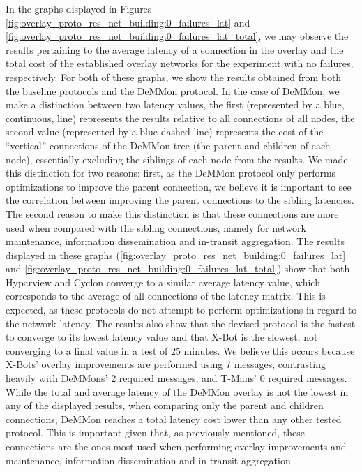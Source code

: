 In the graphs displayed in Figures \ref{fig:overlay_proto_res_net_building:0_failures_lat} and \ref{fig:overlay_proto_res_net_building:0_failures_lat_total}, we may observe the results pertaining to the average latency of a connection in the overlay and the total cost of the established overlay networks for the experiment with no failures, respectively. For both of these graphs, we show the results obtained from both the baseline protocols and the DeMMon protocol. In the case of DeMMon, we make a distinction between two latency values, the first (represented by a blue, continuous, line) represents the results relative to all connections of all nodes, the second value (represented by a blue dashed line) represents the cost of the ``vertical'' connections of the DeMMon tree (the parent and children of each node), essentially excluding the siblings of each node from the results. We made this distinction for two reasons: first, as the DeMMon protocol only performs optimizations to improve the parent connection, we believe it is important to see the correlation between improving the parent connections to the sibling latencies. The second reason to make this distinction is that these connections are more used when compared with the sibling connections, namely for network maintenance, information dissemination and in-transit aggregation. The results displayed in these graphs (\ref{fig:overlay_proto_res_net_building:0_failures_lat} and \ref{fig:overlay_proto_res_net_building:0_failures_lat_total}) show that both Hyparview and Cyclon converge to a similar average latency value, which corresponds to the average of all connections of the latency matrix. This is expected, as these protocols do not attempt to perform optimizations in regard to the network latency. The results also show that the devised protocol is the fastest to converge to its lowest latency value and that X-Bot is the slowest, not converging to a final value in a test of 25 minutes. We believe this occurs because X-Bots' overlay improvements are performed using 7 messages, contrasting heavily with DeMMons' 2 required messages, and T-Mans' 0 required messages. While the total and average latency of the DeMMon overlay is not the lowest in any of the displayed results, when comparing only the parent and children connections, DeMMon reaches a total latency cost lower than any other tested protocol. This is important given that, as previously mentioned, these connections are the ones most used when performing overlay improvements and maintenance, information dissemination and in-transit aggregation. 

